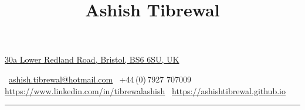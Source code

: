 \documentclass[a4paper,10pt,oneside]{article}
\begin{document}

\title{Ashish Tibrewal}

\begin{subtitle}
\href{https://www.google.co.uk/maps/place/30+Lower+Redland+Rd,+Bristol+BS6+6SU/}
{30a Lower Redland Road, Bristol, BS6 6SU, UK}
\par
\faEnvelope\,
\href{mailto:ashish.tibrewal@hotmail.com}
{ashish.tibrewal@hotmail.com}
\quad \faPhone\,
+44\,(0)\,7927 707009
\quad \faLinkedinSquare\,
\href{https://www.linkedin.com/in/tibrewalashish}
{https://www.linkedin.com/in/tibrewalashish}
\quad \faBriefcase\,
\href{https://ashishtibrewal.github.io}
{https://ashishtibrewal.github.io}
\vspace{8pt}
\hrule
\end{subtitle}
\end{document}
